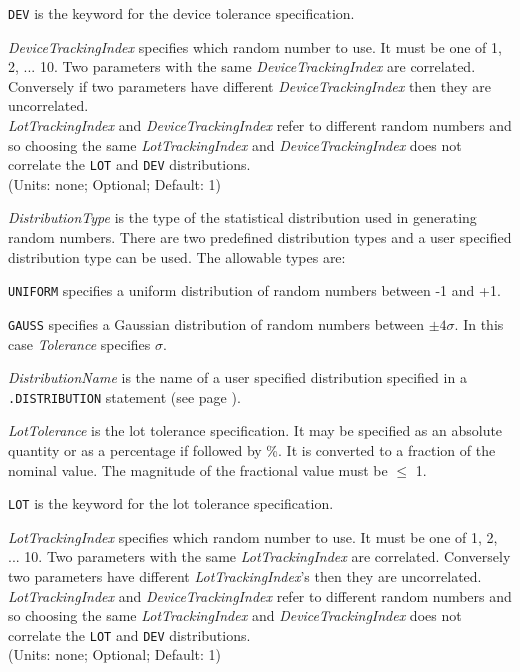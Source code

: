 \begin{widelist}

\item[{\tt DEV}] is the keyword for the device tolerance specification.

\item[{\it DeviceTrackingIndex}] specifies which random number to use.
           It must be one of 1, 2, ... 10.  Two parameters with the same
           {\it DeviceTrackingIndex} are correlated. Conversely
           if two parameters have different
           {\it DeviceTrackingIndex} then they are uncorrelated.\\
           {\it LotTrackingIndex} and {\it DeviceTrackingIndex} refer to
       different random numbers and so choosing the same
           {\it LotTrackingIndex} and {\it DeviceTrackingIndex} does not
       correlate the {\tt LOT} and {\tt DEV} distributions.\\
           (Units: none; Optional; Default: 1)


\item[{\it DistributionType}] is the type of the statistical distribution
           used in generating random numbers.  There are two predefined
       distribution types and a user specified distribution type can be
       used.  The allowable types are:
       \begin{widelist}
       \item[{\tt UNIFORM}] specifies a uniform distribution of random
       numbers between -1 and +1.
       \item[{\tt GAUSS}] specifies a Gaussian distribution of random
       numbers between $\pm 4 \sigma$.  In this case {\it Tolerance}
       specifies $\sigma$.
       \item[{\it DistributionName}] is the name of a user specified
       distribution specified in a {\tt .DISTRIBUTION} statement (see page
       \pageref{.DISTRIBUTIONstatement}).
       \end{widelist}

\item[{\it LotTolerance}] is the lot tolerance specification.
It may be specified as an absolute quantity or as a percentage if
followed by \%. It is converted to a fraction of the
nominal value.  The magnitude of the fractional value must be $\le$ 1.

\item[{\tt LOT}] is the keyword for the lot tolerance specification.

\item[{\it LotTrackingIndex}] specifies which random number to use.
           It must be one of 1, 2, ... 10.  Two parameters with the same
           {\it LotTrackingIndex} are correlated. Conversely
           two parameters have different
           {\it LotTrackingIndex}'s then they are uncorrelated.\\
           {\it LotTrackingIndex} and {\it DeviceTrackingIndex} refer to
       different random numbers and so choosing the same
           {\it LotTrackingIndex} and {\it DeviceTrackingIndex} does not
       correlate the {\tt LOT} and {\tt DEV} distributions.\\
           (Units: none; Optional; Default: 1)


\end{widelist}
